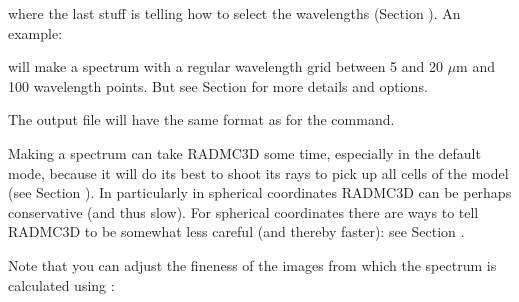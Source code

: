 \documentclass[letterpaper,10pt,english]{sphinxmanual}
\begin{document}
where the last stuff is telling  how to select the wavelengths
(Section {\hyperref[\detokenize{imagesspectra:sec-set-camera-frequencies}]{}}). An example:

\begin{sphinxVerbatim}[commandchars=\\\{\}]
          
\end{sphinxVerbatim}

will make a spectrum with a regular wavelength grid between 5 and 20
\(\mu\mathrm{m}\) and 100 wavelength points. But see Section
{\hyperref[\detokenize{imagesspectra:sec-set-camera-frequencies}]{}} for more details and options.

The output file  will have the same format as for the 
command.

Making a spectrum can take RADMC\sphinxhyphen{}3D some time, especially in the default mode,
because it will do its best to shoot its rays to pick up all cells of the model
(see Section {\hyperref[\detokenize{imagesspectra:sec-recursive-subpixeling}]{}}). In particularly in spherical
coordinates RADMC\sphinxhyphen{}3D can be perhaps  conservative (and thus slow). For
spherical coordinates there are ways to tell RADMC\sphinxhyphen{}3D to be somewhat less
careful (and thereby faster): see Section {\hyperref[\detokenize{imagesspectra:sec-rec-subpixel-spher-coord}]{}}.

Note that you can adjust the fine\sphinxhyphen{}ness of the images from which the spectrum is
calculated using :

\begin{sphinxVerbatim}[commandchars=\\\{\}]
       
\end{sphinxVerbatim}
\end{document}
